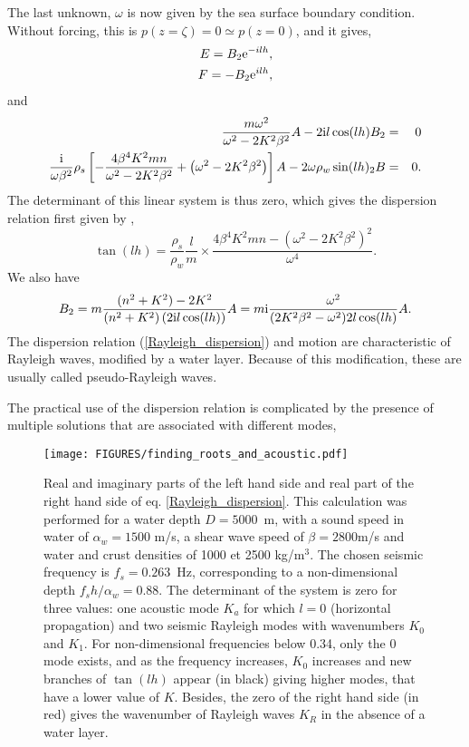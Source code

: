 The last unknown, $\omega$ is now given by the sea surface boundary condition. Without forcing, this is 
$p(z=\zeta)=0 \simeq p(z=0)$, and it gives,  
\begin{eqnarray}
E =  B_2 \mathrm{e}^{-il h}, \\
F =  -B_2 \mathrm{e}^{il h},
\end{eqnarray}
and  
\begin{eqnarray}
   \frac{m \omega^2}{\omega^2-2K^2 \beta^2}   A - 2 \mathrm{i} l  \cos(lh) B_2 &=& 0 \\
 \frac{\mathrm{i}}{\omega \beta^2} \rho_s\left[- \frac{4 \beta^4 K^2 m n}{\omega^2- 2K^2 \beta^2} + \left(\omega^2- 2K^2 \beta^2 \right)\right]
 A - 2 \omega  {\rho_w} \sin(lh)_2 B  &=& 0.
\end{eqnarray}
The determinant of this linear system is thus zero, which gives 
the dispersion relation first given by \cite{Stoneley1926}, %
\begin{equation}
 \tan  \left(  l h \right)=    \frac{\rho_s}{\rho_w} 
\frac{l}{m} 
\times \frac{4 \beta^4 K^2 m n  - \left (\omega^2- 2  K^2 \beta^2 \right)^2   }{ \omega^4 }.\label{Rayleigh_dispersion}
\end{equation}
We also have
\begin{equation}
 B_2=m\frac{(n^2+K^2)-2K^2}{(n^2+K^2)\left(2 \mathrm{i} l \cos(lh)\right)}A
=m \mathrm{i} \frac{\omega^2}{(2 K^2 \beta^2 - \omega^2) 2  l \cos(lh)}A.
\end{equation}
The dispersion relation (\ref{Rayleigh_dispersion}) and motion are characteristic of Rayleigh waves, modified by a water layer. Because of this modification, these
are usually called pseudo-Rayleigh waves. 

The practical use of the dispersion relation is complicated by the presence of multiple solutions that are associated with different modes, 
\begin{figure}[ht]
\centerline{\texttt{[image: FIGURES/finding\_roots\_and\_acoustic.pdf]}}
  \caption{Real and imaginary parts of the left hand side 
  and real part of the right hand side of eq. \ref{Rayleigh_dispersion}. 
This calculation was performed for a water depth $D=5000$~m, with a sound speed in water of  $\alpha_w=1500$ m/s, a shear wave speed of  
$\beta=2800$m/s and water and crust densities of  1000 et 2500 kg/m$^3$. The chosen seismic frequency is $f_s=0.263$~Hz, 
corresponding to a non-dimensional depth $f_s h/\alpha_w=0.88$. 
The determinant of the system is zero for three values: one acoustic mode $K_a$ for which $l=0$ (horizontal propagation) and 
two seismic Rayleigh modes with wavenumbers $K_0$ and $K_1$. For non-dimensional frequencies below 0.34, only the 0 mode exists, 
and as the frequency increases, $K_0$ increases and new branches of  $\tan(lh)$ appear (in black) giving higher modes, that have a lower value 
of $K$. Besides, the zero of the right hand side (in red) gives the wavenumber of Rayleigh waves $K_R$ in the absence of a water layer.}
\label{fig:Rayleigh_roots}
\end{figure}

